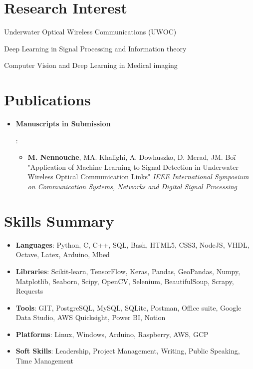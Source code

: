\documentclass[a4paper,20pt]{article}
\newcommand{\resumeItem}[2]{
  \item\small{
    \textbf{#1}{: #2 \vspace{-2pt}}
  }
}
\newcommand{\resumeSubItem}[2]{\resumeItem{#1}{#2}\vspace{-3pt}}
\newcommand{\resumeSubHeadingListStart}{\begin{itemize}[leftmargin=*]}
\newcommand{\resumeSubHeadingListEnd}{\end{itemize}}
\begin{document}
\vspace{-5pt}
\section{Research Interest}
\begin{description}[font=$\bullet$]
  \item{Underwater Optical Wireless Communications (UWOC)}
  \item{Deep Learning in Signal Processing and Information theory}
  \item{Computer Vision and Deep Learning in Medical imaging}
\end{description}

\vspace{-5pt}
\section{Publications}
  \resumeSubHeadingListStart
  \resumeSubItem{Manuscripts in Submission}{
    \begin{itemize}
      \item \textbf{M. Nennouche}, MA. Khalighi, A. Dowhuszko, D. Merad, JM. Boï "Application of Machine Learning to Signal Detection in Underwater Wireless Optical Communication Links" \textit{IEEE International Symposium on Communication Systems, Networks and Digital Signal Processing}
    \end{itemize}
  }
  \resumeSubHeadingListEnd

\vspace{-5pt}
\section{Skills Summary}
	\resumeSubHeadingListStart
    \resumeSubItem{Languages}{Python, C, C++, SQL, Bash, HTML5, CSS3, NodeJS, VHDL, Octave, Latex, Arduino, Mbed}
    \resumeSubItem{Libraries}{Scikit-learn, TensorFlow, Keras, Pandas, GeoPandas, Numpy, Matplotlib, Seaborn, Scipy, OpenCV, Selenium, BeautifulSoup, Scrapy, Requests}
    \resumeSubItem{Tools}{GIT, PostgreSQL, MySQL, SQLite, Postman, Office suite, Google Data Studio, AWS Quicksight, Power BI, Notion}
    \resumeSubItem{Platforms}{Linux, Windows, Arduino, Raspberry, AWS, GCP}
    \resumeSubItem{Soft Skills}{Leadership, Project Management, Writing, Public Speaking, Time Management}
  \resumeSubHeadingListEnd
\end{document}
